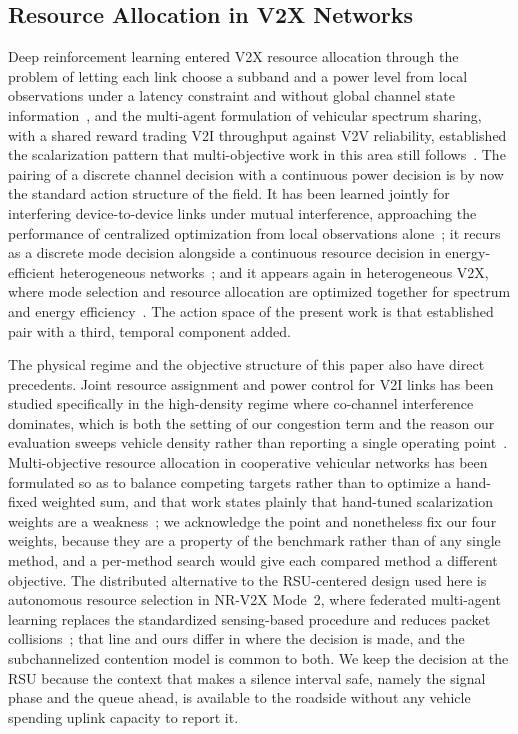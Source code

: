 \documentclass[journal]{IEEEtran}
\begin{document}
\subsection{Resource Allocation in V2X Networks}
Deep reinforcement learning entered V2X resource allocation through the problem of letting each link choose a subband and a power level from local observations under a latency constraint and without global channel state information~\cite{ye2019}, and the multi-agent formulation of vehicular spectrum sharing, with a shared reward trading V2I throughput against V2V reliability, established the scalarization pattern that multi-objective work in this area still follows~\cite{liang2019}. The pairing of a discrete channel decision with a continuous power decision is by now the standard action structure of the field. It has been learned jointly for interfering device-to-device links under mutual interference, approaching the performance of centralized optimization from local observations alone~\cite{tan2021}; it recurs as a discrete mode decision alongside a continuous resource decision in energy-efficient heterogeneous networks~\cite{zhang2021}; and it appears again in heterogeneous V2X, where mode selection and resource allocation are optimized together for spectrum and energy efficiency~\cite{gui2024}. The action space of the present work is that established pair with a third, temporal component added.

The physical regime and the objective structure of this paper also have direct precedents. Joint resource assignment and power control for V2I links has been studied specifically in the high-density regime where co-channel interference dominates, which is both the setting of our congestion term and the reason our evaluation sweeps vehicle density rather than reporting a single operating point~\cite{guo2022}. Multi-objective resource allocation in cooperative vehicular networks has been formulated so as to balance competing targets rather than to optimize a hand-fixed weighted sum, and that work states plainly that hand-tuned scalarization weights are a weakness~\cite{xu20232}; we acknowledge the point and nonetheless fix our four weights, because they are a property of the benchmark rather than of any single method, and a per-method search would give each compared method a different objective. The distributed alternative to the RSU-centered design used here is autonomous resource selection in NR-V2X Mode~2, where federated multi-agent learning replaces the standardized sensing-based procedure and reduces packet collisions~\cite{saad2025}; that line and ours differ in where the decision is made, and the subchannelized contention model is common to both. We keep the decision at the RSU because the context that makes a silence interval safe, namely the signal phase and the queue ahead, is available to the roadside without any vehicle spending uplink capacity to report it.
\end{document}
